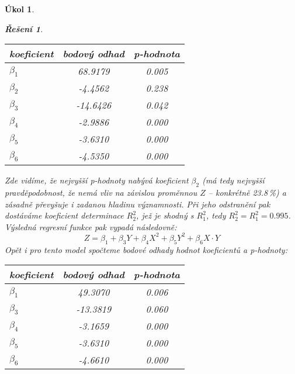 \documentclass[11pt, a4paper]{article}
\theoremstyle{result}
\newtheorem*{result}{Řešení}
\newtheorem{task}{Úkol}
\begin{document}
\begin{task}
\begin{enumerate}[a)]
\begin{result}
            \begin{center}
                \begin{tabular}{ |l|c|c| }
                    \hline
                    \textbf{koeficient} & \textbf{bodový odhad} & \textbf{p-hodnota} \\
                    \hline
                    \boldmath$\beta_1$ & 68.9179 & 0.005 \\
                    \hline
                    \boldmath$\beta_2$ & -4.4562 & 0.238 \\
                    \hline
                    \boldmath$\beta_3$ & -14.6426 & 0.042 \\
                    \hline
                    \boldmath$\beta_4$ & -2.9886 & 0.000 \\
                    \hline
                    \boldmath$\beta_5$ & -3.6310 & 0.000 \\
                    \hline
                    \boldmath$\beta_6$ & -4.5350 & 0.000 \\
                    \hline
                \end{tabular}
            \end{center}

            Zde vidíme, že nejvyšší \textit{p-hodnoty} nabývá koeficient $\beta_2$ (má tedy nejvyšší pravděpodobnost, že nemá vliv na závislou proměnnou $Z$ -- konkrétně 23.8\,\%) a zásadně převyšuje i zadanou hladinu významnosti. Při jeho odstranění pak dostáváme koeficient determinace $R^2_2$, jež je shodný s $R^2_1$, tedy $R^2_2 = R^2_1 = 0.995$. Výsledná regresní funkce pak vypadá následovně:
            $$Z = \beta_1 + \beta_3 Y + \beta_4 X^2 + \beta_5 Y^2 + \beta_6 X \cdot Y$$                  
            Opět i pro tento model spočteme bodové odhady hodnot koeficientů a \textit{p-hodnoty}:

            \begin{center}
                \begin{tabular}{ |l|c|c| }
                    \hline
                    \textbf{koeficient} & \textbf{bodový odhad} & \textbf{p-hodnota} \\
                    \hline
                    \boldmath$\beta_1$ & 49.3070 & 0.006 \\
                    \hline
                    \boldmath$\beta_3$ & -13.3819 & 0.060 \\
                    \hline
                    \boldmath$\beta_4$ & -3.1659 & 0.000 \\
                    \hline
                    \boldmath$\beta_5$ & -3.6310 & 0.000 \\
                    \hline
                    \boldmath$\beta_6$ & -4.6610 & 0.000 \\
                    \hline
                \end{tabular}
            \end{center}


\end{result}
\end{enumerate}
\end{task}
\end{document}
